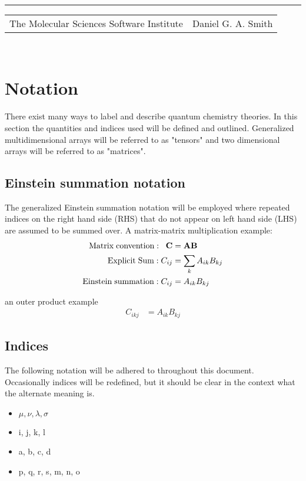 \documentclass[aip,jcp,preprint,superscriptaddress,floatfix]{revtex4-1}
\renewcommand{\title}[1]{\textbf{\large{#1}}\\}
\newcommand{\leftright}[2]{\begin{tabularx}{\textwidth}{X>{\raggedleft}X}#1%
& #2\\\end{tabularx}\\[-1cm]}
\begin{document}
\title{}
\rule{\textwidth}{1pt}
\leftright{The Molecular Sciences Software Institute}{Daniel G. A. Smith} %

\bigskip

\section{Notation}

There exist many ways to label and describe quantum chemistry theories.
In this section the quantities and indices used will be defined and outlined.
Generalized multidimensional arrays will be referred to as "tensors" and two dimensional arrays will be referred to as "matrices".

\subsection{Einstein summation notation}
The generalized Einstein summation notation will be employed where repeated indices on the right hand side (RHS) that do not appear on left hand side (LHS) are assumed to be summed over.
A matrix-matrix multiplication example:
\begin{align}
{\rm Matrix\; convention:\; }\;\;\bf{C} &= \bf{A}\bf{B}\\
{\rm Explicit\; Sum:\; }C_{ij} &= \sum_{k} A_{ik} B_{kj}\\
{\rm Einstein\; summation:\;} C_{ij} &= A_{ik} B_{kj}
\end{align}

an outer product example
\begin{align}
C_{ikj} &= A_{ik} B_{kj}
\end{align}


\subsection{Indices}
The following notation will be adhered to throughout this document.
Occasionally indices will be redefined, but it should be clear in the context what the alternate meaning is.

\begin{itemize} \itemsep1pt \parskip0pt 
\item {}                        $\mu, \nu, \lambda, \sigma$  
\item {}      i, j, k, l
\item {}           a, b, c, d
\item {}                   p, q, r, s, m, n, o
\end{itemize}
\bigskip
\end{document}
